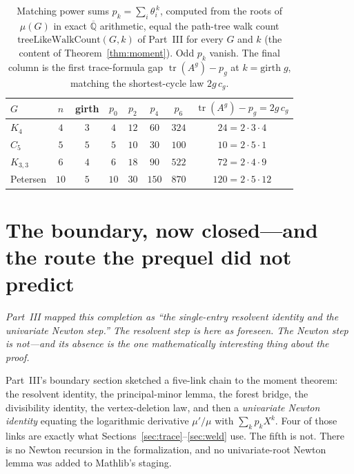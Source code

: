 \documentclass[11pt]{article}
\DeclareMathOperator{\tr}{tr}
\begin{document}
\begin{table}[t]
\centering\small
\caption{Matching power sums $p_k=\sum_i\theta_i^{\,k}$, computed from the roots of $\mu(G)$ in exact
$\overline{\mathbb{Q}}$ arithmetic, equal the path-tree walk count $\mathrm{treeLikeWalkCount}(G,k)$
of Part~III for every $G$ and $k$ (the content of Theorem~\ref{thm:moment}). Odd $p_k$ vanish. The
final column is the first trace-formula gap $\tr(A^{g})-p_{g}$ at $k=\mathrm{girth}\;g$, matching the
shortest-cycle law $2g\,c_g$.}
\label{tab:verify}
\begin{tabular}{@{}lccccccc@{}}
\toprule
\rowcolor{ggteal}
{\color{white}\textbf{$G$}} & {\color{white}$n$} & {\color{white}girth} &
{\color{white}$p_0$} & {\color{white}$p_2$} & {\color{white}$p_4$} & {\color{white}$p_6$} &
{\color{white}$\tr(A^{g})-p_{g}=2g\,c_g$}\\
\midrule
$K_4$        & $4$  & $3$ & $4$  & $12$ & $60$  & $324$  & $24=2\cdot3\cdot4$\\
$C_5$        & $5$  & $5$ & $5$  & $10$ & $30$  & $100$  & $10=2\cdot5\cdot1$\\
$K_{3,3}$    & $6$  & $4$ & $6$  & $18$ & $90$  & $522$  & $72=2\cdot4\cdot9$\\
Petersen     & $10$ & $5$ & $10$ & $30$ & $150$ & $870$  & $120=2\cdot5\cdot12$\\
\bottomrule
\end{tabular}
\end{table}

\section{The boundary, now closed---and the route the prequel did not predict}
\label{sec:boundary}

\emph{Part~III mapped this completion as ``the single-entry resolvent identity and the univariate
Newton step.'' The resolvent step is here as foreseen. The Newton step is not---and its absence is the
one mathematically interesting thing about the proof.}

Part~III's boundary section sketched a five-link chain to the moment theorem: the resolvent identity,
the principal-minor lemma, the forest bridge, the divisibility identity, the vertex-deletion law, and
then a \emph{univariate Newton identity} equating the logarithmic derivative $\mu'/\mu$ with $\sum_k
p_kX^k$. Four of those links are exactly what Sections~\ref{sec:trace}--\ref{sec:weld} use. The fifth
is not. There is no Newton recursion in the formalization, and no univariate-root Newton lemma was
added to Mathlib's staging.
\end{document}
